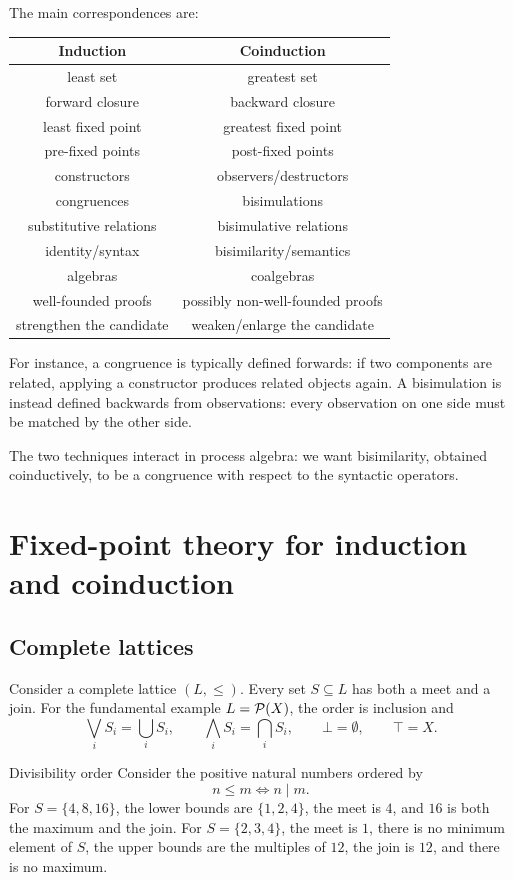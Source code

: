 \documentclass[a4paper]{article}
\begin{document}
The main correspondences are:
\begin{center}
\begin{tabular}{c|c}
Induction & Coinduction \\
\hline
least set & greatest set \\
forward closure & backward closure \\
least fixed point & greatest fixed point \\
pre-fixed points & post-fixed points \\
constructors & observers/destructors \\
congruences & bisimulations \\
substitutive relations & bisimulative relations \\
identity/syntax & bisimilarity/semantics \\
algebras & coalgebras \\
well-founded proofs & possibly non-well-founded proofs \\
strengthen the candidate & weaken/enlarge the candidate
\end{tabular}
\end{center}

For instance, a congruence is typically defined forwards: if two components are related, applying a constructor produces related objects again.
A bisimulation is instead defined backwards from observations: every observation on one side must be matched by the other side.

The two techniques interact in process algebra: we want bisimilarity, obtained coinductively, to be a congruence with respect to the syntactic operators.

\section{Fixed-point theory for induction and coinduction}

\subsection{Complete lattices}

Consider a complete lattice \((L,\leq)\).
Every set \(S\subseteq L\) has both a meet and a join.
For the fundamental example \(L=\mathcal P(X)\), the order is inclusion and
\[
    \bigvee_i S_i = \bigcup_i S_i,
    \qquad
    \bigwedge_i S_i = \bigcap_i S_i,
    \qquad
    \bot=\emptyset,
    \qquad
    \top=X.
\]

\begin{snippetexample}{Divisibility order}
    Consider the positive natural numbers ordered by
    \[
        n\leq m
        \iff
        n\mid m.
    \]
    For \(S=\{4,8,16\}\), the lower bounds are \(\{1,2,4\}\), the meet is \(4\), and \(16\) is both the maximum and the join.
    For \(S=\{2,3,4\}\), the meet is \(1\), there is no minimum element of \(S\), the upper bounds are the multiples of \(12\), the join is \(12\), and there is no maximum.
\end{snippetexample}
\end{document}
